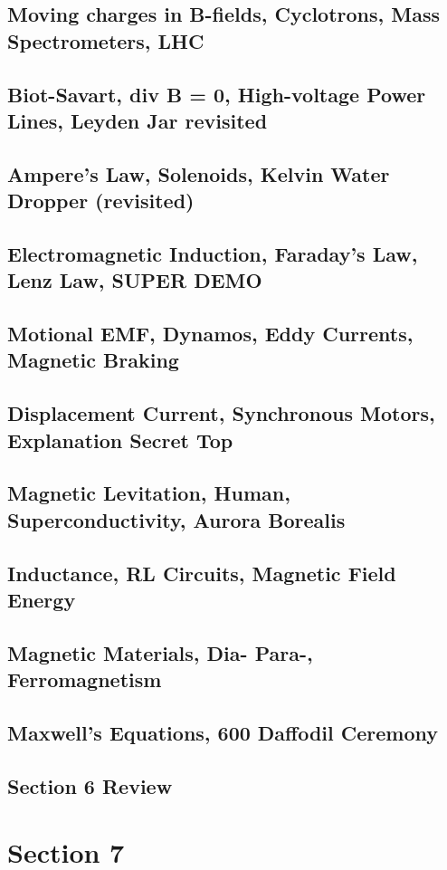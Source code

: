 \documentclass[../introphysics.tex]{subfiles}
\begin{document}
\section{Moving charges in B-fields, Cyclotrons, Mass Spectrometers, LHC}
\section{Biot-Savart, div B = 0, High-voltage Power Lines, Leyden Jar revisited}
\section{Ampere's Law, Solenoids, Kelvin Water Dropper (revisited)}
\section{Electromagnetic Induction, Faraday's Law, Lenz Law, SUPER DEMO}
\section{Motional EMF, Dynamos, Eddy Currents, Magnetic Braking}
\section{Displacement Current, Synchronous Motors, Explanation Secret Top}
\section{Magnetic Levitation, Human, Superconductivity, Aurora Borealis}
\section{Inductance, RL Circuits, Magnetic Field Energy}
\section{Magnetic Materials, Dia- Para-, Ferromagnetism}
\section{Maxwell's Equations, 600 Daffodil Ceremony}
\section{Section 6 Review}
\chapter{Section 7}
\end{document}
